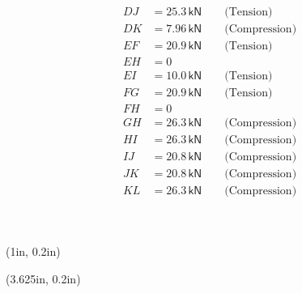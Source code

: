 \documentclass[10pt,oneside]{article}
\def\scale{1}
\begin{document}
\begin{textblock*}{3.125in}
{\begin{align*}
        DJ &= 25.3\,\textsf{kN}\qquad\text{(Tension)}  \\[0.25em]        
        DK &= 7.96\,\textsf{kN}\qquad\text{(Compression)}  \\[0.25em]        
        EF &= 20.9\,\textsf{kN}\qquad\text{(Tension)}  \\[0.25em]        
        EH &= 0  \\[0.25em]        
        EI &= 10.0\,\textsf{kN}\qquad\text{(Tension)}  \\[0.25em]        
        FG &= 20.9\,\textsf{kN}\qquad\text{(Tension)}  \\[0.25em]        
        FH &= 0  \\[0.25em]        
        GH &= 26.3\,\textsf{kN}\qquad\text{(Compression)}  \\[0.25em]        
        HI &= 26.3\,\textsf{kN}\qquad\text{(Compression)}  \\[0.25em]        
        IJ &= 20.8\,\textsf{kN}\qquad\text{(Compression)}  \\[0.25em]        
        JK &= 20.8\,\textsf{kN}\qquad\text{(Compression)}  \\[0.25em]        
        KL &= 26.3\,\textsf{kN}\qquad\text{(Compression)}  \\[0.25em]        
      \end{align*} 
    } 
\end{textblock*}

~\newpage
\begin{textblock*}{2in}(1in, 0.2in)
\end{textblock*}
\begin{textblock*}{4.25in}(3.625in, 0.2in)
	\cbox{
    \centering
    \def\scale{0.75}
    
  }
\end{textblock*}
\end{document}
